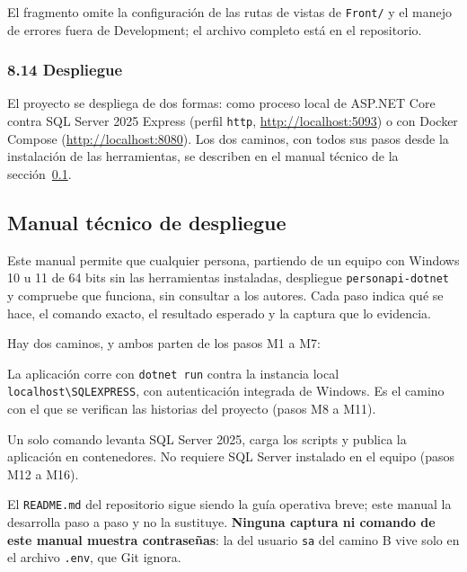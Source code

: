 \documentclass[12pt,letterpaper]{article}
\begin{document}
El fragmento omite la configuración de las rutas de vistas de \texttt{Front/} y el manejo
de errores fuera de Development; el archivo completo está en el repositorio.

\subsubsection{8.14 Despliegue}

El proyecto se despliega de dos formas: como proceso local de ASP.NET Core contra
SQL Server 2025 Express (perfil \texttt{http}, \url{http://localhost:5093}) o con
Docker Compose (\url{http://localhost:8080}). Los dos caminos, con todos sus pasos
desde la instalación de las herramientas, se describen en el manual técnico de la
sección~\ref{sec:manual}.

\subsection{Manual técnico de despliegue}
\label{sec:manual}

Este manual permite que cualquier persona, partiendo de un equipo con Windows 10 u 11
de 64 bits sin las herramientas instaladas, despliegue \texttt{personapi-dotnet} y
compruebe que funciona, sin consultar a los autores. Cada paso indica qué se hace, el
comando exacto, el resultado esperado y la captura que lo evidencia.

Hay dos caminos, y ambos parten de los pasos M1 a M7:

\begin{description}[itemsep=2pt]
  \item[Camino A · ejecución local] La aplicación corre con \texttt{dotnet run} contra
        la instancia local \texttt{localhost\textbackslash SQLEXPRESS}, con autenticación
        integrada de Windows. Es el camino con el que se verifican las historias del
        proyecto (pasos M8 a M11).
  \item[Camino B · Docker Compose] Un solo comando levanta SQL Server 2025, carga los
        scripts y publica la aplicación en contenedores. No requiere SQL Server instalado
        en el equipo (pasos M12 a M16).
\end{description}

El \texttt{README.md} del repositorio sigue siendo la guía operativa breve; este manual
la desarrolla paso a paso y no la sustituye. \textbf{Ninguna captura ni comando de este
manual muestra contraseñas}: la del usuario \texttt{sa} del camino B vive solo en el
archivo \texttt{.env}, que Git ignora.
\end{document}
